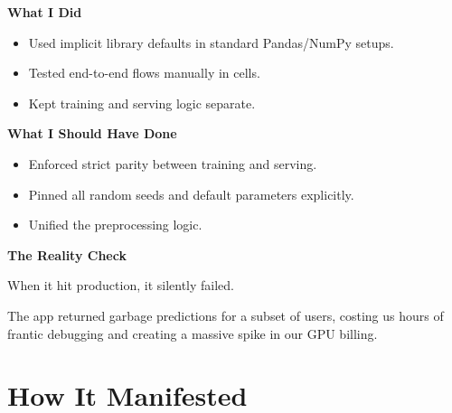 \documentclass[11pt]{article}
\begin{document}
\begin{minipage}[t]{0.45\textwidth}
    {\large\color{brandred}\textbf{What I Did}}

    \begin{itemize}[leftmargin=*, itemsep=0.1in, label={\color{brandred}\textbullet}]
        \item Used implicit library defaults in standard Pandas/NumPy setups.
        \item Tested end-to-end flows manually in cells.
        \item Kept training and serving logic separate.
    \end{itemize}

\end{minipage}
\hfill
\begin{minipage}[t]{0.45\textwidth}

    {\large\color{brandgreen}\textbf{What I Should Have Done}}

    \begin{itemize}[leftmargin=*, itemsep=0.1in, label={\color{brandgreen}\textbullet}]
        \item Enforced strict parity between training and serving.
        \item Pinned all random seeds and default parameters explicitly.
        \item Unified the preprocessing logic.
    \end{itemize}

\end{minipage}

\vspace{0.3in}

\begin{darkbox}

{\large\textbf{The Reality Check}}

\vspace{0.05in}

When it hit production, it silently failed. 

The app returned garbage predictions for a subset of users, costing us hours of frantic debugging and creating a massive spike in our GPU billing.

\end{darkbox}

\vfill
\newpage


\section*{How It Manifested}
\end{document}
